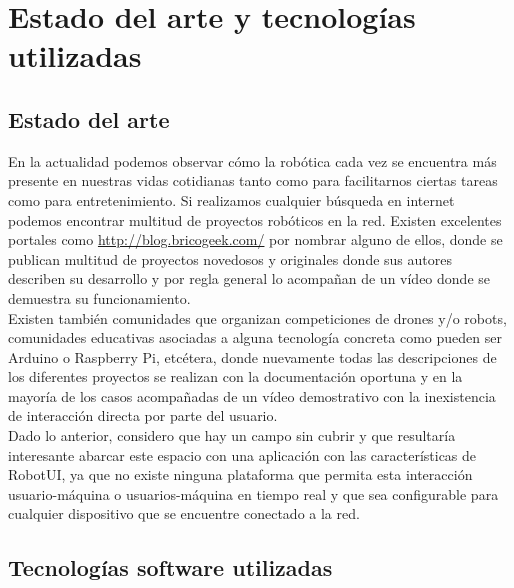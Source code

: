 

\chapter[Herramientas utilizadas]{Estado del arte y tecnologías utilizadas}
\label{chap:herramientas}


\section{Estado del arte}

En la actualidad podemos observar cómo la robótica cada vez se encuentra más presente en nuestras vidas cotidianas tanto como para facilitarnos ciertas tareas como para entretenimiento. Si realizamos 
cualquier búsqueda en internet podemos encontrar multitud de proyectos robóticos en la red. Existen excelentes portales como \url{http://blog.bricogeek.com/} por nombrar alguno de ellos, donde se
publican multitud de proyectos novedosos y originales donde sus autores describen su desarrollo y por regla general lo acompañan de un vídeo donde se demuestra su funcionamiento.\\

Existen también comunidades que organizan competiciones de drones y/o robots, comunidades educativas asociadas a alguna tecnología concreta como pueden ser Arduino o Raspberry Pi, etcétera, donde nuevamente todas las 
descripciones de los diferentes proyectos se realizan con la documentación oportuna y en la mayoría de los casos acompañadas de un vídeo demostrativo con la inexistencia de interacción directa por parte 
del usuario.\\


Dado lo anterior, considero que hay un campo sin cubrir y que resultaría interesante abarcar este espacio con una aplicación con las características de RobotUI, ya que no existe
ninguna plataforma que permita esta interacción usuario-máquina o usuarios-máquina en tiempo real y que sea configurable para cualquier dispositivo que se encuentre conectado a la red.\\



\section{Tecnologías software utilizadas}


